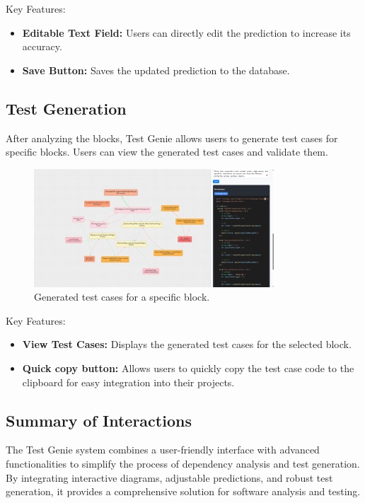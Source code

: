 Key Features:
\begin{itemize}
    \item \textbf{Editable Text Field:} Users can directly edit the prediction to increase its accuracy.
    \item \textbf{Save Button:} Saves the updated prediction to the database.
\end{itemize}

\subsection{Test Generation}

After analyzing the blocks, Test Genie allows users to generate test cases for specific blocks. Users can view the generated test cases and validate them.

\begin{figure}[H]
    \centering
    \includegraphics[width=0.8\textwidth]{images/generated_test.png}
    \caption{Generated test cases for a specific block.}
    \label{fig:generated-test}
\end{figure}

Key Features:
\begin{itemize}
    \item \textbf{View Test Cases:} Displays the generated test cases for the selected block.
    \item \textbf{Quick copy button:} Allows users to quickly copy the test case code to the clipboard for easy integration into their projects.
\end{itemize}

\subsection{Summary of Interactions}

The Test Genie system combines a user-friendly interface with advanced functionalities to simplify the process of dependency analysis and test generation. By integrating interactive diagrams, adjustable predictions, and robust test generation, it provides a comprehensive solution for software analysis and testing.